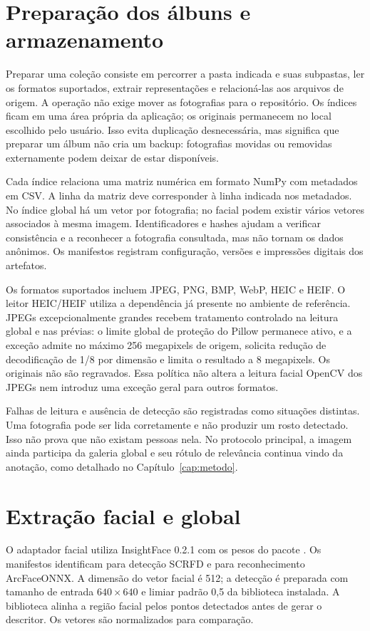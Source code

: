 \section{Preparação dos álbuns e armazenamento}
Preparar uma coleção consiste em percorrer a pasta indicada e suas subpastas, ler os formatos suportados, extrair representações e relacioná-las aos arquivos de origem. A operação não exige mover as fotografias para o repositório. Os índices ficam em uma área própria da aplicação; os originais permanecem no local escolhido pelo usuário. Isso evita duplicação desnecessária, mas significa que preparar um álbum não cria um backup: fotografias movidas ou removidas externamente podem deixar de estar disponíveis.

Cada índice relaciona uma matriz numérica em formato NumPy com metadados em CSV. A linha da matriz deve corresponder à linha indicada nos metadados. No índice global há um vetor por fotografia; no facial podem existir vários vetores associados à mesma imagem. Identificadores e hashes ajudam a verificar consistência e a reconhecer a fotografia consultada, mas não tornam os dados anônimos. Os manifestos registram configuração, versões e impressões digitais dos artefatos.

Os formatos suportados incluem JPEG, PNG, BMP, WebP, HEIC e HEIF. O leitor HEIC/HEIF utiliza a dependência já presente no ambiente de referência. JPEGs excepcionalmente grandes recebem tratamento controlado na leitura global e nas prévias: o limite global de proteção do Pillow permanece ativo, e a exceção admite no máximo 256 megapixels de origem, solicita redução de decodificação de 1/8 por dimensão e limita o resultado a 8 megapixels. Os originais não são regravados. Essa política não altera a leitura facial OpenCV dos JPEGs nem introduz uma exceção geral para outros formatos.

Falhas de leitura e ausência de detecção são registradas como situações distintas. Uma fotografia pode ser lida corretamente e não produzir um rosto detectado. Isso não prova que não existam pessoas nela. No protocolo principal, a imagem ainda participa da galeria global e seu rótulo de relevância continua vindo da anotação, como detalhado no Capítulo~\ref{cap:metodo}.

\section{Extração facial e global}
O adaptador facial utiliza InsightFace 0.2.1 com os pesos do pacote . Os manifestos identificam  para detecção SCRFD e  para reconhecimento ArcFaceONNX. A dimensão do vetor facial é 512; a detecção é preparada com tamanho de entrada $640\times640$ e limiar padrão 0,5 da biblioteca instalada. A biblioteca alinha a região facial pelos pontos detectados antes de gerar o descritor. Os vetores são normalizados para comparação.

